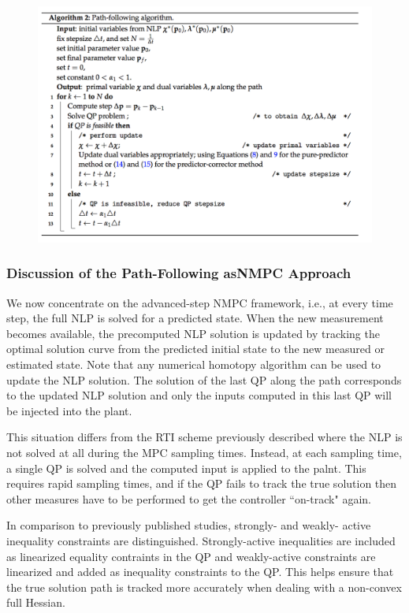 \documentclass{article}
\theoremstyle{example}
\theoremstyle{definition}
\theoremstyle{assumption}
\theoremstyle{lemma}
\begin{document}
	\begin{figure}[H]
		\centering
		\includegraphics[scale=0.6]{pred_corr_algo}
	\end{figure}
\subsubsection{Discussion of the Path-Following asNMPC Approach}
We now concentrate on the advanced-step NMPC framework, i.e., at every time step, the full NLP is solved for a predicted state.
When the new measurement becomes available, the precomputed NLP solution is updated by tracking the optimal solution curve from the predicted initial state to the new measured or estimated state.
Note that any numerical homotopy algorithm can be used to update the NLP solution.
The solution of the last QP along the path corresponds to the updated NLP solution and only the inputs computed in this last QP will be injected into the plant.
\par
This situation differs from the RTI scheme previously described where the NLP is not solved at all during the MPC sampling times.
Instead, at each sampling time, a single QP is solved and the computed input is applied to the palnt.
This requires rapid sampling times, and if the QP fails to track the true solution then other measures have to be performed to get the controller ``on-track" again.
\par
In comparison to previously published studies, strongly- and weakly- active inequality constraints are distinguished.
Strongly-active inequalities are included as linearized equality contraints in the QP and weakly-active constraints are linearized and added as inequality constraints to the QP.
This helps ensure that the true solution path is tracked more accurately when dealing with a non-convex full Hessian.
\end{document}
